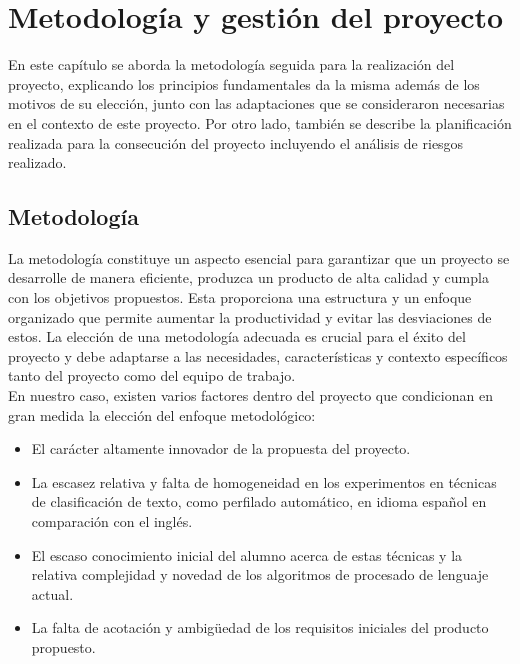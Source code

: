 \chapter{Metodología y gestión del proyecto}
\label{chap:metodologia}
En este capítulo se aborda la metodología seguida para la realización del proyecto, explicando los principios fundamentales da la misma además de los motivos de su elección, junto con las adaptaciones que se consideraron necesarias en el contexto de este proyecto. Por otro lado, también se describe la planificación realizada para la consecución del proyecto incluyendo el análisis de riesgos realizado.

\section{Metodología}
La metodología constituye un aspecto esencial para garantizar que un proyecto se desarrolle de manera eficiente, produzca un producto de alta calidad y cumpla con los objetivos propuestos. Esta proporciona una estructura y un enfoque organizado que permite aumentar la productividad y evitar las desviaciones de estos. La elección de una metodología adecuada es crucial para el éxito del proyecto y debe adaptarse a las necesidades, características y contexto específicos tanto del proyecto como del equipo de trabajo.\\
En nuestro caso, existen varios factores dentro del proyecto que condicionan en gran medida la elección del enfoque metodológico:\\
\begin{itemize}
    \item El carácter altamente innovador de la propuesta del proyecto.
    \item La escasez relativa y falta de homogeneidad en los experimentos en técnicas de clasificación de texto, como perfilado automático, en idioma español en comparación con el inglés.
    \item El escaso conocimiento inicial del alumno acerca de estas técnicas y la relativa complejidad y novedad de los algoritmos de procesado de lenguaje actual.
    \item La falta de acotación y ambigüedad de los requisitos iniciales del producto propuesto.
\end{itemize}

